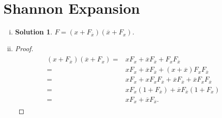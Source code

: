 \documentclass[acmlarge,screen=true,anonymous=false,11pt]{acmart}
\newtheorem*{solution*}{Solution}
\begin{document}
\section{Shannon Expansion}
\begin{enumerate}[(i)]
    \item \begin{solution*}
        $F = (x + F_{\overline{x}})(\overline{x} + F_x)$.
    \end{solution*}

\item \begin{proof}
    \begin{align}
        \begin{aligned}
        (x + F_{\overline{x}})(\overline{x} + F_x) = & xF_x + \overline{x}F_{\overline{x}} + F_x F_{\overline{x}}\\
        = & xF_x + \overline{x}F_{\overline{x}} + (x + \overline{x}) F_x F_{\overline{x}}\\
        = & xF_x + x F_x F_{\overline{x}} + \overline{x}F_{\overline{x}} + \overline{x} F_x F_{\overline{x}}\\
        = & xF_x(1 + F_{\overline{x}}) + \overline{x}F_{\overline{x}}(1 + F_x)\\
        = & xF_x + \overline{x}F_{\overline{x}}.
        \end{aligned}
    \end{align}
\end{proof}
\end{enumerate}
\end{document}
